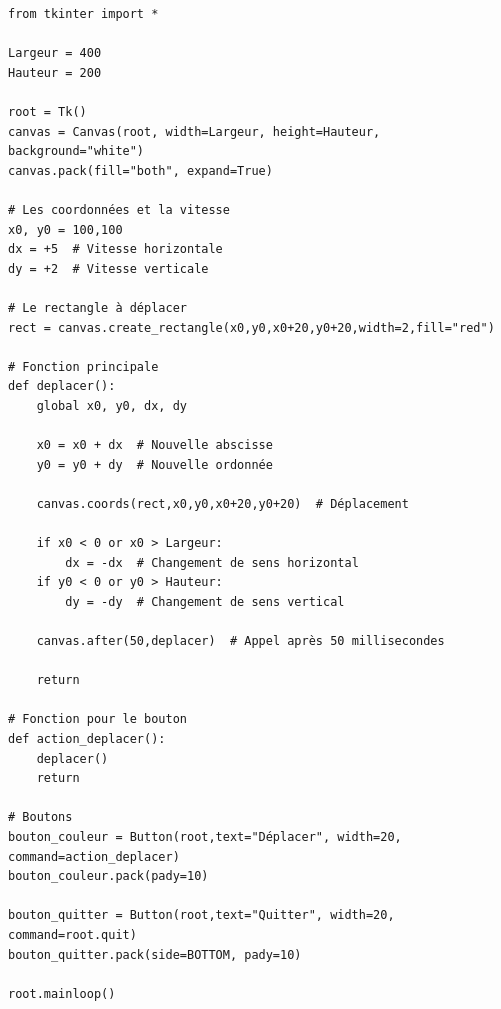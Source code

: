 \documentclass[11pt,class=report,crop=false]{standalone}
\begin{document}
\begin{lstlisting}
from tkinter import *

Largeur = 400
Hauteur = 200

root = Tk()     
canvas = Canvas(root, width=Largeur, height=Hauteur, background="white")
canvas.pack(fill="both", expand=True)

# Les coordonnées et la vitesse
x0, y0 = 100,100
dx = +5  # Vitesse horizontale
dy = +2  # Vitesse verticale

# Le rectangle à déplacer
rect = canvas.create_rectangle(x0,y0,x0+20,y0+20,width=2,fill="red")

# Fonction principale
def deplacer():
    global x0, y0, dx, dy

    x0 = x0 + dx  # Nouvelle abscisse
    y0 = y0 + dy  # Nouvelle ordonnée

    canvas.coords(rect,x0,y0,x0+20,y0+20)  # Déplacement

    if x0 < 0 or x0 > Largeur:
        dx = -dx  # Changement de sens horizontal
    if y0 < 0 or y0 > Hauteur:
        dy = -dy  # Changement de sens vertical

    canvas.after(50,deplacer)  # Appel après 50 millisecondes
 
    return
    
# Fonction pour le bouton
def action_deplacer():
    deplacer()
    return

# Boutons
bouton_couleur = Button(root,text="Déplacer", width=20, command=action_deplacer)
bouton_couleur.pack(pady=10)

bouton_quitter = Button(root,text="Quitter", width=20, command=root.quit)
bouton_quitter.pack(side=BOTTOM, pady=10)

root.mainloop()
\end{lstlisting}
\end{document}
